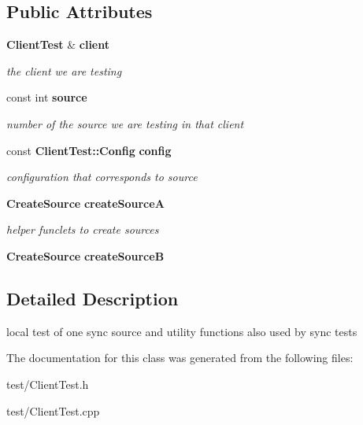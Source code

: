 \subsection*{Public Attributes}
\begin{CompactItemize}
\item 
{\bf Client\-Test} \& {\bf client}\label{classLocalTests_e5709a00bd1d0c0aaa98c48ed255098c}

\begin{CompactList}\small\item\em the client we are testing \item\end{CompactList}\item 
const int {\bf source}\label{classLocalTests_08ad8ca8670698be655bf547a78b4471}

\begin{CompactList}\small\item\em number of the source we are testing in that client \item\end{CompactList}\item 
const {\bf Client\-Test::Config} {\bf config}\label{classLocalTests_b745c9235176e04fae5a0b918aebb87e}

\begin{CompactList}\small\item\em configuration that corresponds to source \item\end{CompactList}\item 
{\bf Create\-Source} {\bf create\-Source\-A}\label{classLocalTests_a3e9f028a40fbe46322ac2e7e8fe5640}

\begin{CompactList}\small\item\em helper funclets to create sources \item\end{CompactList}\item 
{\bf Create\-Source} \textbf{create\-Source\-B}\label{classLocalTests_abae458e7851e1dbc05eba556037a5ed}

\end{CompactItemize}


\subsection{Detailed Description}
local test of one sync source and utility functions also used by sync tests 



The documentation for this class was generated from the following files:\begin{CompactItemize}
\item 
test/Client\-Test.h\item 
test/Client\-Test.cpp\end{CompactItemize}
